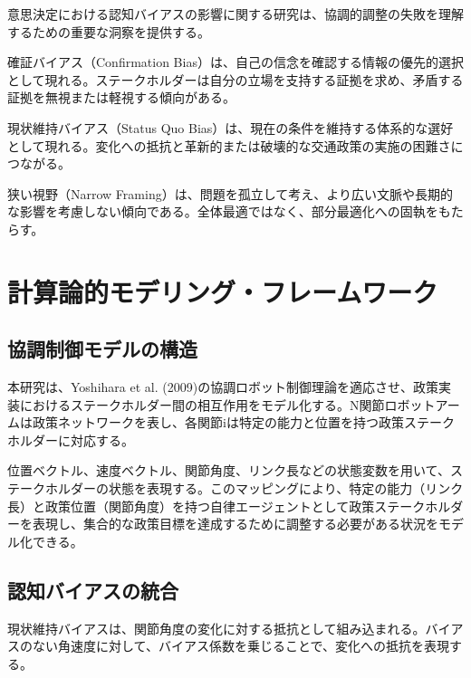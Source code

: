 意思決定における認知バイアスの影響に関する研究は、協調的調整の失敗を理解するための重要な洞察を提供する。

確証バイアス（Confirmation Bias）は、自己の信念を確認する情報の優先的選択として現れる。ステークホルダーは自分の立場を支持する証拠を求め、矛盾する証拠を無視または軽視する傾向がある。

現状維持バイアス（Status Quo Bias）は、現在の条件を維持する体系的な選好として現れる。変化への抵抗と革新的または破壊的な交通政策の実施の困難さにつながる。

狭い視野（Narrow Framing）は、問題を孤立して考え、より広い文脈や長期的な影響を考慮しない傾向である。全体最適ではなく、部分最適化への固執をもたらす。

\section{計算論的モデリング・フレームワーク}
\label{sec:ch4_modeling}

\subsection{協調制御モデルの構造}

本研究は、Yoshihara et al. (2009)の協調ロボット制御理論を適応させ、政策実装におけるステークホルダー間の相互作用をモデル化する。N関節ロボットアームは政策ネットワークを表し、各関節iは特定の能力と位置を持つ政策ステークホルダーに対応する。

位置ベクトル、速度ベクトル、関節角度、リンク長などの状態変数を用いて、ステークホルダーの状態を表現する。このマッピングにより、特定の能力（リンク長）と政策位置（関節角度）を持つ自律エージェントとして政策ステークホルダーを表現し、集合的な政策目標を達成するために調整する必要がある状況をモデル化できる。

\subsection{認知バイアスの統合}

現状維持バイアスは、関節角度の変化に対する抵抗として組み込まれる。バイアスのない角速度に対して、バイアス係数を乗じることで、変化への抵抗を表現する。

